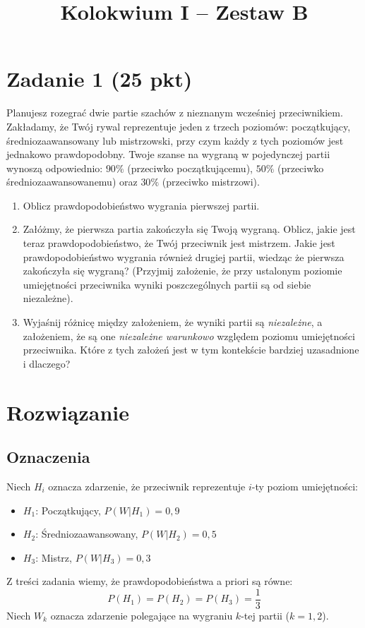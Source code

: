 \documentclass[polish, 10pt]{extarticle}
\begin{document}
\title{Kolokwium I -- Zestaw B}
\author{}
\date{}

\maketitle
\vspace{-2cm}

\section*{Zadanie 1 (25 pkt)}
Planujesz rozegrać dwie partie szachów z nieznanym wcześniej przeciwnikiem. Zakładamy, że Twój rywal reprezentuje jeden z trzech poziomów: początkujący, średniozaawansowany lub mistrzowski, przy czym każdy z tych poziomów jest jednakowo prawdopodobny.
Twoje szanse na wygraną w pojedynczej partii wynoszą odpowiednio: \(90\%\) (przeciwko początkującemu), \(50\%\) (przeciwko średniozaawansowanemu) oraz \(30\%\) (przeciwko mistrzowi).

\begin{enumerate}
  \item Oblicz prawdopodobieństwo wygrania pierwszej partii.
  \item Załóżmy, że pierwsza partia zakończyła się Twoją wygraną. Oblicz, jakie jest teraz prawdopodobieństwo, że Twój przeciwnik jest mistrzem. Jakie jest prawdopodobieństwo wygrania również drugiej partii, wiedząc że pierwsza zakończyła się wygraną? (Przyjmij założenie, że przy ustalonym poziomie umiejętności przeciwnika wyniki poszczególnych partii są od siebie niezależne). 
  \item Wyjaśnij różnicę między założeniem, że wyniki partii są \textit{niezależne}, a założeniem, że są one \textit{niezależne warunkowo} względem poziomu umiejętności przeciwnika. Które z tych założeń jest w tym kontekście bardziej uzasadnione i dlaczego?
\end{enumerate}

\section*{Rozwiązanie}

\subsection*{Oznaczenia}
Niech $H_i$ oznacza zdarzenie, że przeciwnik reprezentuje $i$-ty poziom umiejętności:
\begin{itemize}
    \item $H_1$: Początkujący, $P(W|H_1) = 0,9$
    \item $H_2$: Średniozaawansowany, $P(W|H_2) = 0,5$
    \item $H_3$: Mistrz, $P(W|H_3) = 0,3$
\end{itemize}
Z treści zadania wiemy, że prawdopodobieństwa a priori są równe:
\[ P(H_1) = P(H_2) = P(H_3) = \frac{1}{3} \]
Niech $W_k$ oznacza zdarzenie polegające na wygraniu $k$-tej partii ($k=1, 2$).
\end{document}

